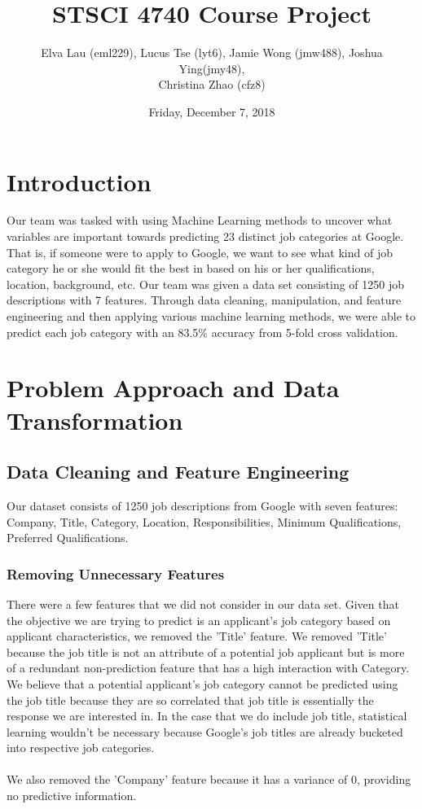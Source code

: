 \documentclass[9.5 pt]{article}
\title{\textbf{STSCI 4740 Course Project}}
\date{Friday, December 7, 2018}
\author{Elva Lau (eml229), Lucus Tse (lyt6), Jamie Wong (jmw488), Joshua Ying(jmy48), \\ Christina Zhao (cfz8)}
\begin{document}
\clearpage
\thispagestyle{empty}
\maketitle
\pagebreak
{}
\tableofcontents %
\pagebreak


\pagebreak[4]
\setcounter{page}{1}

\section{Introduction}
Our team was tasked with using Machine Learning methods to uncover what variables are important towards predicting 23 distinct job categories at Google. That is, if someone were to apply to Google, we want to see what kind of job category he or she would fit the best in based on his or her qualifications, location, background, etc.  Our team was given a data set consisting of 1250 job descriptions with 7 features. Through data cleaning, manipulation, and feature engineering and then applying various machine learning methods, we were able to predict each job category with an 83.5\% accuracy from 5-fold cross validation.

\section{Problem Approach and Data Transformation}
\subsection{Data Cleaning and Feature Engineering}
\par Our dataset consists of 1250 job descriptions from Google with seven features: Company, Title, Category, Location, Responsibilities, Minimum Qualifications, Preferred Qualifications. 
\subsubsection{Removing Unnecessary Features} 
There were a few features that we did not consider in our data set. Given that the objective we are trying to predict is an applicant's job category based on applicant characteristics, we removed the 'Title' feature. We removed 'Title' because the job title is not an attribute of a potential job applicant but is more of a redundant non-prediction feature that has a high interaction with Category. We believe that a potential applicant's job category cannot be predicted using the job title because they are so correlated that job title is essentially the response we are interested in. In the case that we do include job title, statistical learning wouldn't be necessary because Google's job titles are already bucketed into respective job categories. \\ \\
We also removed the 'Company' feature because it has a variance of 0, providing no predictive information.
\end{document}
